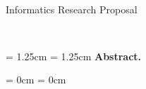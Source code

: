 \thispagestyle{plain}

\begin{center}
  \huge
  \textbf{\@title}\\
  \vspace{.5em}
  \large
  Informatics Research Proposal
  \vspace{.5em}

  \normalsize
  \@author\\
  \@date
  \vspace{.5em}
\end{center}

\leftskip  = 1.25cm
\rightskip = 1.25cm
\noindent
\textbf{Abstract.}

\leftskip  = 0cm
\rightskip = 0cm
